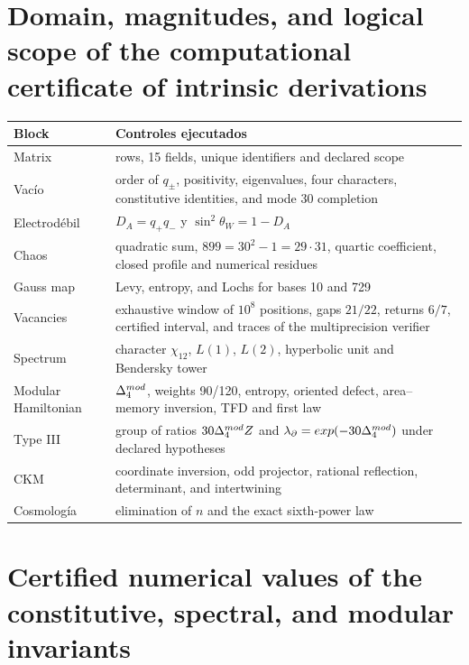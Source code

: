 \section{Domain, magnitudes, and logical scope of the computational certificate of intrinsic derivations}

\begin{longtable}{@{}>{\raggedright\arraybackslash}p{}>{\raggedright\arraybackslash}p{}@{}}
\toprule
Block & Controles ejecutados\\
\midrule
\endhead
Matrix & 58 rows, 15 fields, unique identifiers and declared scope\\
Vac\'io & order of \(q_\pm\), positivity, eigenvalues, four characters, constitutive identities, and mode 30 completion\\
Electrod\'ebil & \(D_A=q_+q_-\) y \(\sin^2\theta_W=1-D_A\)\\
Chaos & quadratic sum, \(899=30^2-1=29\cdot31\), quartic coefficient, closed profile and numerical residues\\
Gauss map & Levy, entropy, and Lochs for bases 10 and 729\\
Vacancies & exhaustive window of \(10^8\) positions, gaps \(21/22\), returns \(6/7\), certified interval, and traces of the multiprecision verifier\\
Spectrum & character \(\chi_{12}\), \(L(1)\), \(L(2)\), hyperbolic unit and Bendersky tower\\
Modular Hamiltonian & \(\Delta_{4}^{mod}\), weights 90/120, entropy, oriented defect, area--memory inversion, TFD and first law\\
Type III & group of ratios \(30\Delta_{4}^{mod}Z\) and \(\lambda_\partial=exp(-30\Delta_{4}^{mod})\) under declared hypotheses\\
CKM & coordinate inversion, odd projector, rational reflection, determinant, and intertwining\\
Cosmolog\'ia & elimination of \(n\) and the exact sixth-power law\\
\bottomrule
\end{longtable}

\section{Certified numerical values of the constitutive, spectral, and modular invariants}

